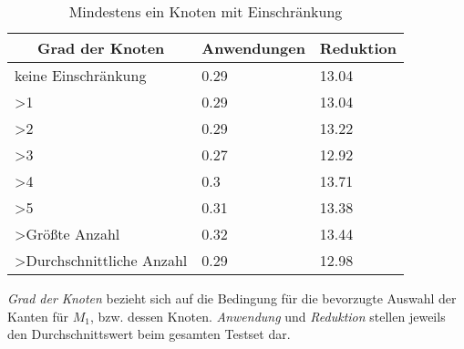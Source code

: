 \begin{table}[htb]
\caption{Mindestens ein Knoten mit Einschränkung\label{tab:degreeOR}}
\vspace*{1em}
\centering

\bgroup
\def\arraystretch{1.3}%

\begin{threeparttable}

\begin{tabular}[c]{lll}
	\hline
	\multicolumn{1}{c}{\textbf{Grad der Knoten}} & 
	\multicolumn{1}{c}{\textbf{Anwendungen}} & 
	\multicolumn{1}{c}{\textbf{Reduktion}} \\ 
	
	\hline

	keine Einschränkung&0.29&13.04\\
	>1&0.29 &13.04 \\
	>2&0.29 &13.22 \\
	>3& 0.27& 12.92 \\
	>4& 0.3& 13.71 \\
	>5& 0.31&13.38 \\
	>Größte Anzahl& 0.32&13.44 \\
	>Durchschnittliche Anzahl& 0.29&12.98 \\
	\hline
\end{tabular}
\begin{tablenotes}\footnotesize
\item \emph{Grad der Knoten} bezieht sich auf die Bedingung für die bevorzugte Auswahl der Kanten für $M_{1}$, bzw. dessen Knoten. \emph{Anwendung} und \emph{Reduktion} stellen jeweils den Durchschnittswert beim gesamten Testset dar.
\end{tablenotes}

\end{threeparttable}

\egroup

\end{table}

